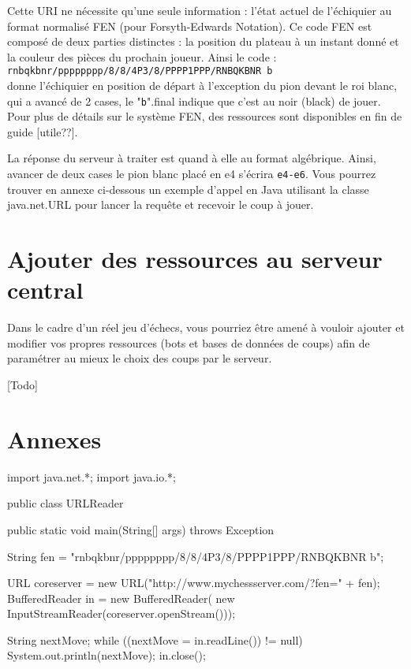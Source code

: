 \documentclass[a4paper,11pt]{article}
\begin{document}
	Cette URI ne nécessite qu'une seule information : l'état actuel de l'échiquier au format normalisé FEN (pour Forsyth-Edwards Notation). Ce code FEN est composé de deux parties distinctes : la position du plateau à un instant donné et la couleur des pièces du prochain joueur. Ainsi le code : \\{\tt rnbqkbnr/pppppppp/8/8/4P3/8/PPPP1PPP/RNBQKBNR b}\\ donne l'échiquier en position de départ à l'exception du pion devant le roi blanc, qui a avancé de 2 cases, le "{\tt b}".final indique que c'est au noir (black) de jouer. Pour plus de détails sur le système FEN, des ressources sont disponibles en fin de guide [utile??].
	
	La réponse du serveur à traiter est quand à elle au format algébrique. Ainsi, avancer de deux cases le pion blanc placé en e4 s'écrira {\tt e4-e6}. Vous pourrez trouver en annexe ci-dessous un exemple d'appel en Java utilisant la classe java.net.URL pour lancer la requête et recevoir le coup à jouer.
	
\section{Ajouter des ressources au serveur central}
	 Dans le cadre d'un réel jeu d'échecs, vous pourriez être amené à vouloir ajouter et modifier vos propres ressources (bots et bases de données de coups) afin de paramétrer au mieux le choix des coups par le serveur.
	 
	 [Todo]
	 
	 
	 
\section{Annexes}

\begin{java}[{Java}]
import java.net.*;
import java.io.*;

public class URLReader {
    public static void main(String[] args) throws Exception {
		String fen = "rnbqkbnr/pppppppp/8/8/4P3/8/PPPP1PPP/RNBQKBNR b";
		
        URL coreserver = new URL("http://www.mychessserver.com/?fen=" + fen);
        BufferedReader in = new BufferedReader(
        new InputStreamReader(coreserver.openStream()));

        String nextMove;
        while ((nextMove = in.readLine()) != null)
            System.out.println(nextMove);
        in.close();
    }
}
\end{java}
\end{document}
